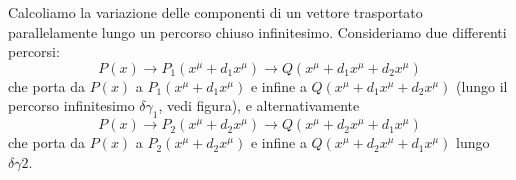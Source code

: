 Calcoliamo la variazione delle componenti di un vettore trasportato
parallelamente lungo un percorso chiuso infinitesimo.  Consideriamo due
differenti percorsi:
\begin{equation}
  P(x) \to P_1(x^{\mu} + d_1 x^{\mu}) \to Q(x^{\mu} + d_1 x^{\mu} + d_2 x^{\mu})
\end{equation}
che porta da $P(x)$ a $P_1(x^{\mu} + d_1 x^{\mu})$ e infine a $Q(x^{\mu} + d_1
x^{\mu} + d_2 x^{\mu})$ (lungo il percorso infinitesimo $\delta \gamma_1$, vedi
figura), e alternativamente
\begin{equation}
  P(x)\to  P_2(x^{\mu} + d_2 x^{\mu})\to Q(x^{\mu} + d_2 x^{\mu} + d_1 x^{\mu})
\end{equation}
che porta da $P(x)$ a $P_2(x^{\mu} + d_2 x^{\mu})$ e infine a $Q(x^{\mu} + d_2
x^{\mu} + d_1 x^{\mu})$ lungo $\delta \gamma2$.

